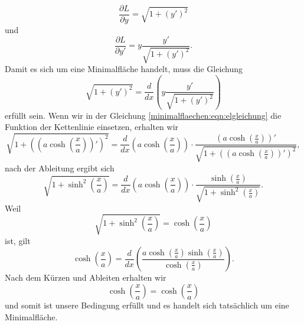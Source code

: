 \begin{equation}
	\frac{\partial L}{\partial y} = \sqrt{1 + (y')^2}
\end{equation}
und 
\begin{equation}
	\frac{\partial L}{\partial y'} = y \frac{y'}{\sqrt{1 + (y')^2}}.
\end{equation}
Damit es sich um eine Minimalfläche handelt, muss die Gleichung
\begin{equation}
	\sqrt{1 + (y')^2} = \frac{d}{dx} \left( y \frac{y'}{\sqrt{1 + (y')^2}} \right)
	\label{minimalflaechen:eqn:elgleichung}
\end{equation}
erfüllt sein.
Wenn wir in der Gleichung \eqref{minimalflaechen:eqn:elgleichung}  die Funktion der Kettenlinie einsetzen, erhalten wir 
\begin{equation}
	\sqrt{1 + \left( \left( a \cosh \left( \frac{x}{a} \right) \right)' \right)^2 } = \frac{d}{dx} \left( a \cosh \left( \frac{x}{a} \right) \right) \cdot \frac{\left( a \cosh \left( \frac{x}{a} \right) \right)'}{\sqrt{1 + \left( \left( a \cosh \left( \frac{x}{a} \right) \right)' \right)^2 }},
\end{equation}
nach der Ableitung ergibt sich 
\begin{equation}
	\sqrt{1 + \sinh^2 \left( \frac{x}{a} \right)} = \frac{d}{dx}  \left( a \cosh \left( \frac{x}{a} \right) \right) \cdot \frac{\sinh \left( \frac{x}{a} \right)}{\sqrt{1 + \sinh^2 \left( \frac{x}{a} \right)}}.
\end{equation}
Weil
\begin{equation}
	\sqrt{1 + \sinh^2 \left( \frac{x}{a} \right)} = \cosh \left( \frac{x}{a} \right)
\end{equation}
ist, gilt 
\begin{equation}
	\cosh \left( \frac{x}{a} \right) = \frac{d}{dx} \left( \frac{a \cosh \left( \frac{x}{a} \right) \sinh \left( \frac{x}{a} \right)}{\cosh \left( \frac{x}{a} \right)} \right).
\end{equation}	
Nach dem Kürzen und Ableiten erhalten wir 
\begin{equation}
	\cosh \left( \frac{x}{a} \right) = \cosh \left( \frac{x}{a} \right)
\end{equation}	
%
und somit ist unsere Bedingung erfüllt und es handelt sich tatsächlich um eine Minimalfläche. 
